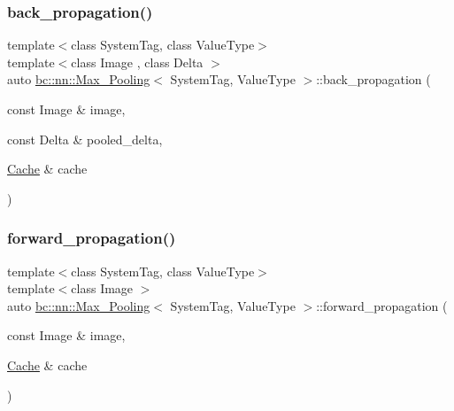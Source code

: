\subsubsection{\texorpdfstring{back\+\_\+propagation()}{back\_propagation()}}
{\footnotesize\ttfamily template$<$class System\+Tag, class Value\+Type$>$ \\
template$<$class Image , class Delta $>$ \\
auto \hyperlink{structbc_1_1nn_1_1Max__Pooling}{bc\+::nn\+::\+Max\+\_\+\+Pooling}$<$ System\+Tag, Value\+Type $>$\+::back\+\_\+propagation (\begin{DoxyParamCaption}\item[{const Image \&}]{image,  }\item[{const Delta \&}]{pooled\+\_\+delta,  }\item[{\hyperlink{structbc_1_1nn_1_1Cache}{Cache} \&}]{cache }\end{DoxyParamCaption})\hspace{0.3cm}{\ttfamily [inline]}}

\mbox{\label{structbc_1_1nn_1_1Max__Pooling_adb17cec0e6f91755e663c42b74d2ad29}} 
\subsubsection{\texorpdfstring{forward\+\_\+propagation()}{forward\_propagation()}}
{\footnotesize\ttfamily template$<$class System\+Tag, class Value\+Type$>$ \\
template$<$class Image $>$ \\
auto \hyperlink{structbc_1_1nn_1_1Max__Pooling}{bc\+::nn\+::\+Max\+\_\+\+Pooling}$<$ System\+Tag, Value\+Type $>$\+::forward\+\_\+propagation (\begin{DoxyParamCaption}\item[{const Image \&}]{image,  }\item[{\hyperlink{structbc_1_1nn_1_1Cache}{Cache} \&}]{cache }\end{DoxyParamCaption})\hspace{0.3cm}{\ttfamily [inline]}}

\mbox{\label{structbc_1_1nn_1_1Max__Pooling_af6cbfd7b406742ea3ae1028497eedd5f}} 
